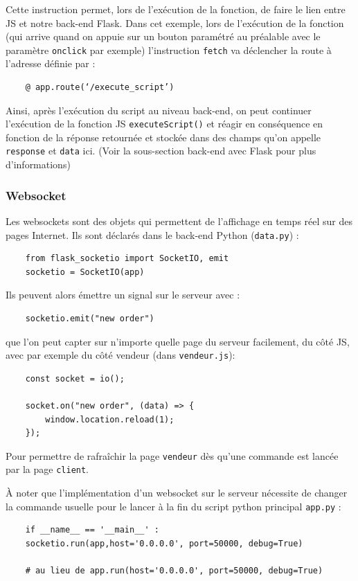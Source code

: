 \documentclass[a4paper,12pt]{report}  %
\begin{document}
Cette instruction permet, lors de l’exécution de la fonction, de faire le lien entre JS et notre back-end Flask. Dans cet exemple, lors de l’exécution de la fonction (qui arrive quand on appuie sur un bouton paramétré au préalable avec le paramètre \texttt{onclick} par exemple) l’instruction \texttt{fetch} va déclencher la route à l’adresse définie par :
\begin{lstlisting}
	@ app.route(‘/execute_script’)
\end{lstlisting}

Ainsi, après l’exécution du script au niveau back-end, on peut continuer l’exécution de la fonction JS \texttt{executeScript()} et réagir en conséquence en fonction de la réponse retournée et stockée dans des champs qu’on appelle \texttt{response} et \texttt{data} ici. (Voir la sous-section back-end avec Flask pour plus d’informations)

\subsubsection{Websocket}

Les websockets sont des objets qui permettent de l’affichage en temps réel sur des pages Internet. Ils sont déclarés dans le back-end Python (\texttt{data.py}) : 
\begin{lstlisting}
	from flask_socketio import SocketIO, emit
	socketio = SocketIO(app)
\end{lstlisting}

Ils peuvent alors émettre un signal sur le serveur avec : 
\begin{lstlisting}
	socketio.emit("new order")
\end{lstlisting}
que l’on peut capter sur n’importe quelle page du serveur facilement, du côté JS, avec par exemple du côté vendeur (dans \texttt{vendeur.js}): 
\begin{lstlisting}
	const socket = io();
	
	socket.on("new order", (data) => {
		window.location.reload(1);
	});
\end{lstlisting}

Pour permettre de rafraîchir la page \texttt{vendeur} dès qu’une commande est lancée par la page \texttt{client}.

À noter que l’implémentation d’un websocket sur le serveur nécessite de changer la commande usuelle pour le lancer à la fin du script python principal \texttt{app.py} :
\begin{lstlisting}
	if __name__ == '__main__' :
	socketio.run(app,host='0.0.0.0', port=50000, debug=True)
	
	# au lieu de app.run(host='0.0.0.0', port=50000, debug=True)
\end{lstlisting}
\end{document}
